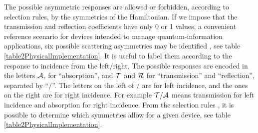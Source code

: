 The possible asymmetric responses are allowed or forbidden, according to selection rules,  by the symmetries of the Hamiltonian.
If we impose that the transmission and reflection coefficients  have only 0 or 1 values,  a convenient reference scenario for  devices intended to manage quantum-information applications, six possible scattering asymmetries may be identified \cite{Ruschhaupt2017}, see table \ref{table2PhysicalImplementation}. It is useful to label them according to the response  to incidence from the left/right. The possible responses are encoded in the  letters ${\cal{A}}$,
for ``absorption'', and ${\cal{T}}$ and ${\cal{R}}$ for ``transmission'' and ``reflection'', separated by ``$/$''. The
letters on the left of $/$ are for left incidence, and the ones on the right are for right incidence. For example ${\cal T/A}$ means transmission for left incidence and absorption for right
incidence. From the selection rules \cite{Ruschhaupt2017}, it is possible to determine which symmetries allow for a given device, see table \ref{table2PhysicalImplementation}.

